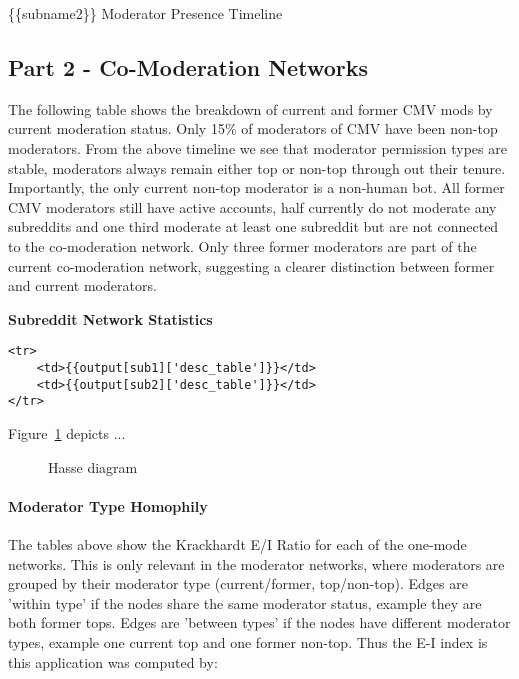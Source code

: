 \documentclass[11pt]{article}
\begin{document}
\{\{subname2\}\} Moderator Presence Timeline

    \subsection{Part 2 - Co-Moderation
Networks}\label{part-2---co-moderation-networks}

The following table shows the breakdown of current and former CMV mods
by current moderation status. Only 15\% of moderators of CMV have been
non-top moderators. From the above timeline we see that moderator
permission types are stable, moderators always remain either top or
non-top through out their tenure. Importantly, the only current non-top
moderator is a non-human bot. All former CMV moderators still have
active accounts, half currently do not moderate any subreddits and one
third moderate at least one subreddit but are not connected to the
co-moderation network. Only three former moderators are part of the
current co-moderation network, suggesting a clearer distinction between
former and current moderators.

\textbf{Subreddit Network Statistics}

\begin{verbatim}
<tr>
    <td>{{output[sub1]['desc_table']}}</td>
    <td>{{output[sub2]['desc_table']}}</td>
</tr>
\end{verbatim}

    \begin{example}
  Figure~\ref{fig:hasse} depicts ...
\begin{figure}[twomode_net_td.png]
\centering
{}
\caption{Hasse diagram}
\label{fig:hasse}
\end{figure}
\end{example}

    \paragraph{Moderator Type Homophily}\label{moderator-type-homophily}

The tables above show the Krackhardt E/I Ratio for each of the one-mode
networks. This is only relevant in the moderator networks, where
moderators are grouped by their moderator type (current/former,
top/non-top). Edges are 'within type' if the nodes share the same
moderator status, example they are both former tops. Edges are 'between
types' if the nodes have different moderator types, example one current
top and one former non-top. Thus the E-I index is this application was
computed by:
\end{document}

